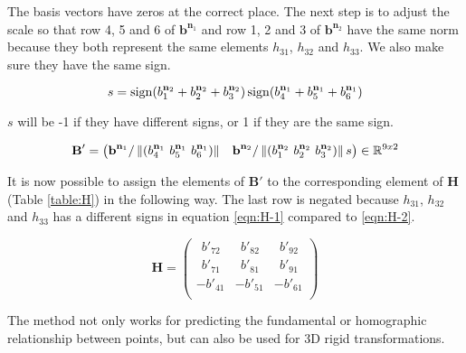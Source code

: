 The basis vectors have zeros at the correct place. The next step is to adjust the scale so that row 4, 5 and 6 of $\textbf{b}^{\textbf{n}_1}$ and row 1, 2 and 3 of $\textbf{b}^{\textbf{n}_2}$ have the same norm because they both represent the same elements $h_{31}$, $h_{32}$ and $h_{33}$. We also make sure they have the same sign.

\begin{equation}
s = \operatorname{sign}(b^{\textbf{n}_2}_1 + b^{\textbf{n}_2}_2 + b^{\textbf{n}_2}_3) \operatorname{sign}(b^{\textbf{n}_1}_4 + b^{\textbf{n}_1}_5 + b^{\textbf{n}_1}_6)
\end{equation}

$s$ will be -1 if they have different signs, or 1 if they are the same sign.

\begin{equation}
\textbf{B}'=
\begin{pmatrix}
\textbf{b}^{\textbf{n}_1} / \norm{(b^{\textbf{n}_1}_4 \ b^{\textbf{n}_1}_5 \ b^{\textbf{n}_1}_6)
} &
\textbf{b}^{\textbf{n}_2} / \norm{(b^{\textbf{n}_2}_1 \ b^{\textbf{n}_2}_2 \ b^{\textbf{n}_2}_3)} s
\end{pmatrix}
\in \mathbb{R}^{9x2}
\end{equation}

It is now possible to assign the elements of $\textbf{B}'$ to the corresponding element of $\textbf{H}$ (Table \ref{table:H}) in the following way. The last row is negated because $h_{31}$, $h_{32}$ and $h_{33}$ has a different signs in equation \ref{eqn:H-1} compared to \ref{eqn:H-2}.

\begin{equation}
\textbf{H}=
\begin{pmatrix}
\ \ b'_{72} & \ \ b'_{82} & \ \ b'_{92} \\
\ \ b'_{71} & \ \ b'_{81} & \ \ b'_{91} \\
-b'_{41} & -b'_{51} & -b'_{61} \\
\end{pmatrix}
\end{equation}

The method not only works for predicting the fundamental or homographic relationship between points, but can also be used for 3D rigid transformations.


